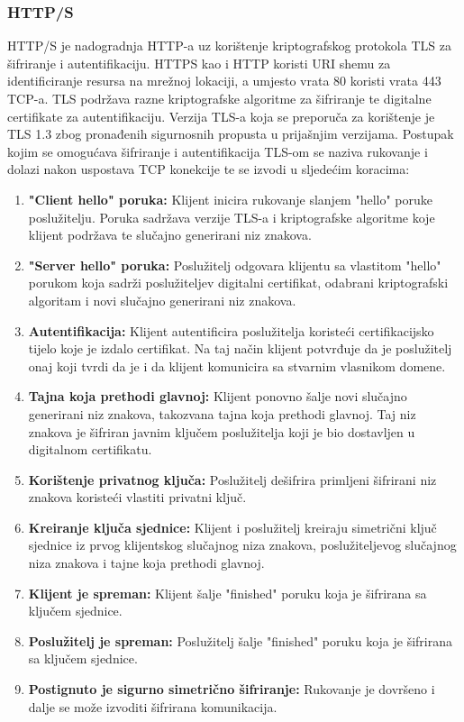 \documentclass[times, utf8, diplomski]{fer}
\begin{document}
\subsubsection{HTTP/S}
HTTP/S  je nadogradnja HTTP-a uz korištenje kriptografskog protokola TLS  za šifriranje i autentifikaciju. HTTPS kao i HTTP koristi URI shemu za identificiranje resursa na mrežnoj lokaciji, a umjesto vrata 80 koristi vrata 443 TCP-a. TLS podržava razne kriptografske algoritme za šifriranje te digitalne certifikate za autentifikaciju. Verzija TLS-a koja se preporuča za korištenje je TLS 1.3 zbog pronađenih sigurnosnih propusta u prijašnjim verzijama. Postupak kojim se omogućava šifriranje i autentifikacija TLS-om se naziva rukovanje i dolazi nakon uspostava TCP konekcije te se izvodi u sljedećim koracima\cite{TLS}:
\begin{enumerate}
    \item\textbf{"Client hello" poruka:} Klijent inicira rukovanje slanjem "hello" poruke poslužitelju. Poruka sadržava verzije TLS-a i kriptografske algoritme koje klijent podržava te slučajno generirani niz znakova.
    \item\textbf{"Server hello" poruka:} Poslužitelj odgovara klijentu sa vlastitom "hello" porukom koja sadrži poslužiteljev digitalni certifikat, odabrani kriptografski algoritam i novi slučajno generirani niz znakova.
    \item\textbf{Autentifikacija:} Klijent autentificira poslužitelja koristeći certifikacijsko tijelo koje je izdalo certifikat. Na taj način klijent potvrđuje da je poslužitelj onaj koji tvrdi da je i da klijent komunicira sa stvarnim vlasnikom domene.
    \item\textbf{Tajna koja prethodi glavnoj:} Klijent ponovno šalje novi slučajno generirani niz znakova, takozvana tajna koja prethodi glavnoj. Taj niz znakova je šifriran javnim ključem poslužitelja koji je bio dostavljen u digitalnom certifikatu.
    \item\textbf{Korištenje privatnog ključa:} Poslužitelj dešifrira primljeni šifrirani niz znakova koristeći vlastiti privatni ključ.
    \item\textbf{Kreiranje ključa sjednice:} Klijent i poslužitelj kreiraju simetrični ključ sjednice iz prvog klijentskog slučajnog niza znakova, poslužiteljevog slučajnog niza znakova i tajne koja prethodi glavnoj.
    \item\textbf{Klijent je spreman:} Klijent šalje "finished" poruku koja je šifrirana sa ključem sjednice.
    \item\textbf{Poslužitelj je spreman:} Poslužitelj šalje "finished" poruku koja je šifrirana sa ključem sjednice.
    \item\textbf{Postignuto je sigurno simetrično šifriranje:} Rukovanje je dovršeno i dalje se može izvoditi šifrirana komunikacija.
\end{enumerate}
\end{document}
